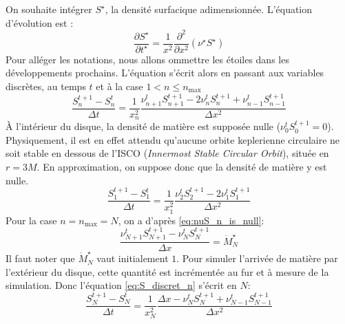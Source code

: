 On souhaite intégrer $S^\star$, la densité surfacique adimensionnée. L'équation d'évolution est :
\begin{equation}
  \frac{\partial S^\star}{\partial t^\star} = \frac{1}{x^2}\frac{\partial^2}{\partial x^2}\left(\nu^\star S^\star\right)
\end{equation}
Pour alléger les notations, nous allons ommettre les étoiles dans les développements prochains. L'équation s'écrit alors en passant aux variables discrètes, au temps $t$ et à la case $1<n\leq n_\textrm{max}$
\begin{equation}
  \label{eq:S_discret_n}
  \frac{S^{t+1}_n - S^t_n}{\Delta t} = \frac{1}{x_n^2}\frac{\nu^t_{n+1}S^{t+1}_{n+1} - 2 \nu^t_nS^{t+1}_n + \nu^t_{n-1}S^{t+1}_{n-1}}{\Delta x^2}
\end{equation}
À l'intérieur du disque, la densité de matière est supposée nulle ($\nu^t_{0}S^{t+1}_{0} = 0$). Physiquement, il est en effet attendu qu'aucune orbite keplerienne circulaire ne soit stable en dessous de l'ISCO (\emph{\emph{I}nnermost \emph{S}table \emph{C}ircular \emph{O}rbit}), située en $r = 3M$. En approximation, on suppose donc que la densité de matière y est nulle.
\begin{equation}
  \label{eq:S_discret_1}
  \frac{S^{t+1}_1 - S^t_1}{\Delta t} = \frac{1}{x_1^2}\frac{\nu^t_{2}S^{t+1}_{2} - 2 \nu^t_1S^{t+1}_1}{\Delta x^2}
\end{equation}
Pour la case $n = n_\textrm{max} = N$, on a d'après \eqref{eq:nuS_n_is_null}:
\begin{equation}
  \frac{\nu^{t}_{N+1}S^{t+1}_{N+1} - \nu^{t}_NS^{t+1}_N}{\Delta x} = \dot{M}^\star_N
\end{equation}
Il faut noter que $\dot{M}^\star_N$ vaut initialement $1$. Pour simuler l'arrivée de matière par l'extérieur du disque, cette quantité est incrémentée au fur et à mesure de la simulation.
Donc l'équation \eqref{eq:S_discret_n} s'écrit en $N$:
\begin{equation}
  \label{eq:S_discret_N}
  \frac{S^{t+1}_N - S^t_N}{\Delta t} = \frac{1}{x_N^2}\frac{\Delta x - \nu^{t}_NS^{t+1}_N + \nu^{t}_{N-1}S^{t+1}_{N-1}}{\Delta x^2}
\end{equation}

